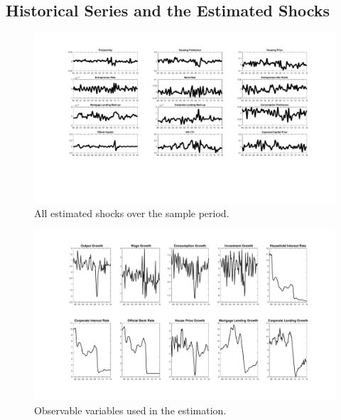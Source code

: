 \documentclass[12pt]{article}
\numberwithin{equation}{section}
\begin{document}
\begin{appendix}

\section{Historical Series and the Estimated Shocks}

\begin{figure}[ht]
\centering
\caption{All estimated shocks over the sample period.}
\label{estimated_shocks}
\includegraphics[scale=0.4]{smoothed_shocks.pdf}
\end{figure}


\begin{figure}
\centering
\caption{Observable variables used in the estimation.}
\label{estimated_shocks}
\includegraphics[scale=0.4]{dataset.pdf}
\end{figure}



\end{appendix}
\end{document}
